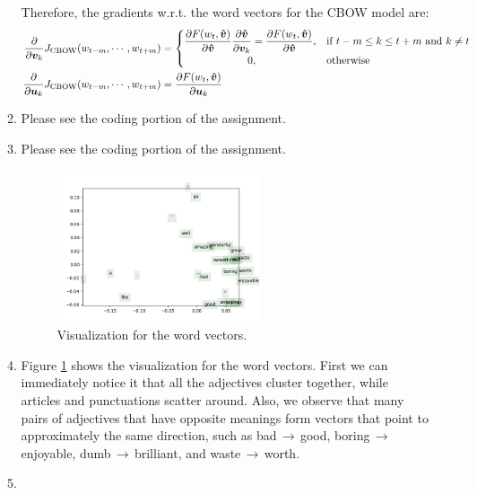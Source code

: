 \documentclass[10pt,reqno]{amsart}
\begin{document}
\begin{enumerate}[topsep=0pt,itemsep=3ex,partopsep=1ex,parsep=1ex]
\begin{enumerate}[itemsep=2ex]
    Therefore, the gradients w.r.t. the word vectors for the CBOW model are:
    \begin{align*}
      \frac{\partial}{\partial \bm{v}_k} J_\text{CBOW}(w_{t-m},\cdots,w_{t+m}) &= 
      \begin{cases}
        \displaystyle\frac{\partial F(w_t, \bm{\hat{v}})}{\partial \bm{\hat{v}}} \frac{\partial \bm{\hat{v}}}{\partial \bm{v}_k} 
        = \displaystyle\frac{\partial F(w_t, \bm{\hat{v}})}{\partial \bm{\hat{v}}} , & \text{if}\ t-m \leq k \leq t+m\ \text{and}\ k \neq t\\
        \qquad\qquad\qquad 0, & \text{otherwise}
      \end{cases}\\
      \frac{\partial}{\partial \bm{u}_k} J_\text{CBOW}(w_{t-m},\cdots,w_{t+m}) 
      &= \frac{\partial F(w_t, \bm{\hat{v}})}{\partial \bm{u}_k} 
    \end{align*}
    
  \item Please see the coding portion of the assignment.
  \item Please see the coding portion of the assignment.
    \begin{figure}[h]
      \includegraphics[width=0.6\textwidth]{../code/q3_word_vectors.png}
      \caption{Visualization for the word vectors.}
      \label{fig1}
    \end{figure}
  \item
    Figure \ref{fig1} shows the visualization for the word vectors. 
    First we can immediately notice it that all the adjectives cluster together, 
    while articles and punctuations scatter around. 
    Also, we observe that many pairs of adjectives that have opposite meanings 
    form vectors that point to approximately the same direction, such as 
    bad$\,\to\,$good, 
    boring$\,\to\,$enjoyable,
    dumb$\,\to\,$brilliant, and
    waste$\,\to\,$worth.
  \item
  \end{enumerate}



\end{enumerate}
\end{document}
